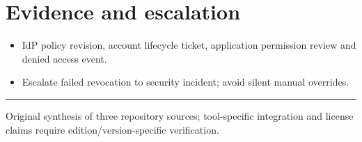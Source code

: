 \documentclass[10pt,letterpaper]{article}
\begin{document}
\section{Evidence and escalation}
\begin{itemize}
\item IdP policy revision, account lifecycle ticket, application permission review and denied access event.
\item Escalate failed revocation to security incident; avoid silent manual overrides.
\end{itemize}
\vfill\noindent\color{muted}\rule{\linewidth}{0.4pt}\par\scriptsize Original synthesis of three repository sources; tool-specific integration and license claims require edition/version-specific verification.\normalsize
\end{document}
